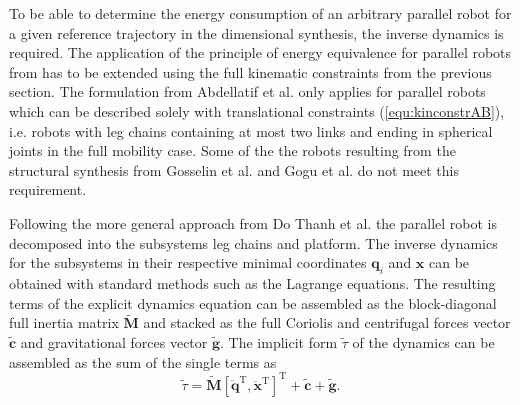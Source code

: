 \documentclass[fleqn,a4paper,10pt]{article}
\newcommand{\bm}[1]{\mathbf{#1}}
\newcommand{\transp}[0]{{\mathrm{T}}}
\begin{document}
\begin{multicols}{2}
To be able to determine the energy consumption of an arbitrary parallel robot for a given reference trajectory in the dimensional synthesis, the inverse dynamics is required.
The application of the principle of energy equivalence for parallel robots from \cite{AbdellatifHei2009,DoThanhKotHeiOrt2009b} has to be extended using the full kinematic constraints from the previous section.
The formulation from Abdellatif et al. \cite{AbdellatifHei2009} only applies for parallel robots which can be described solely with translational constraints (\ref{equ:kinconstrAB}), i.e. robots with leg chains containing at most two links and ending in spherical joints in the full mobility case.
Some of the the robots resulting from the structural synthesis from Gosselin et al. \cite{KongGos2007} and Gogu et al. \cite{Gogu2008} do not meet this requirement.

Following the more general approach from Do Thanh et al. \cite{DoThanhKotHeiOrt2009b} the parallel robot is decomposed into the subsystems leg chains and platform.
The inverse dynamics for the subsystems in their respective minimal coordinates $\bm{q}_i$ and $\bm{x}$ can be obtained with standard methods such as the Lagrange equations.
The resulting terms of the explicit dynamics equation can be assembled as the block-diagonal full inertia matrix $\tilde{\bm{M}}$ and stacked as the full Coriolis and centrifugal forces vector $\tilde{\bm{c}}$ and gravitational forces vector $\tilde{\bm{g}}$.
The implicit form $\tilde{\tau}$ of the dynamics can be assembled as the sum of the single terms as
\begin{equation}
\tilde{\tau} = \tilde{\bm{M}} [\ddot{\bm{q}}^\transp, \ddot{\bm{x}}^\transp]^\transp + \tilde{\bm{c}} + \tilde{\bm{g}}.
\label{equ:subsys_implicit_dyn}
\end{equation}



\end{multicols}
\end{document}
